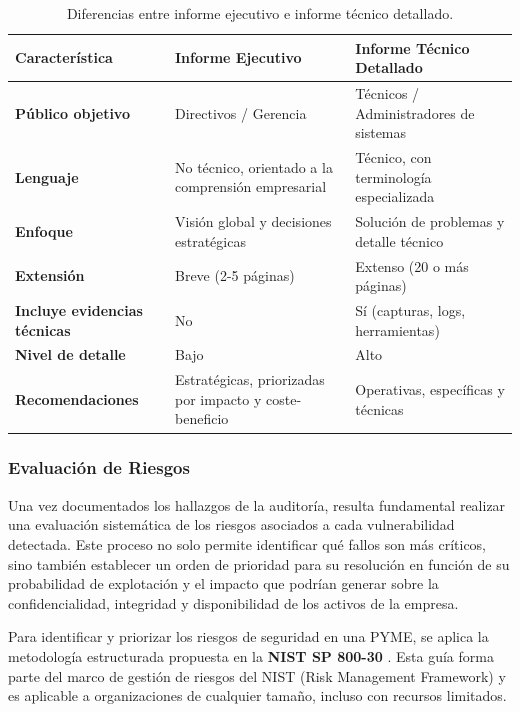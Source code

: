 \documentclass[a4paper, 11pt]{article}
\begin{document}
\begin{table}[H]
\centering
\begin{tabular}{|p{4cm}|p{5cm}|p{5cm}|}
\hline
\textbf{Característica} & \textbf{Informe Ejecutivo} & \textbf{Informe Técnico Detallado} \\
\hline
\textbf{Público objetivo} & Directivos / Gerencia & Técnicos / Administradores de sistemas \\
\hline
\textbf{Lenguaje} & No técnico, orientado a la comprensión empresarial & Técnico, con terminología especializada \\
\hline
\textbf{Enfoque} & Visión global y decisiones estratégicas & Solución de problemas y detalle técnico \\
\hline
\textbf{Extensión} & Breve (2-5 páginas) & Extenso (20 o más páginas) \\
\hline
\textbf{Incluye evidencias técnicas} & No & Sí (capturas, logs, herramientas) \\
\hline
\textbf{Nivel de detalle} & Bajo & Alto \\
\hline
\textbf{Recomendaciones} & Estratégicas, priorizadas por impacto y coste-beneficio & Operativas, específicas y técnicas \\
\hline
\end{tabular}
\caption{Diferencias entre informe ejecutivo e informe técnico detallado.}
\end{table}








\subsubsection{Evaluación de Riesgos}
\label{sec:ev_riesgos}
Una vez documentados los hallazgos de la auditoría, resulta fundamental realizar una evaluación sistemática de los riesgos asociados a 
cada vulnerabilidad detectada. Este proceso no solo permite identificar qué fallos son más críticos, sino también establecer un orden de 
prioridad para su resolución en función de su probabilidad de explotación y el impacto que podrían generar sobre la confidencialidad, 
integridad y disponibilidad de los activos de la empresa.



Para identificar y priorizar los riesgos de seguridad en una PYME, se aplica la metodología estructurada propuesta en la \textbf{NIST SP 800-30} \cite{nist80030}. Esta guía forma parte del marco de gestión de riesgos del NIST (Risk Management Framework) y es aplicable a organizaciones de cualquier tamaño, incluso con recursos limitados.
\end{document}
